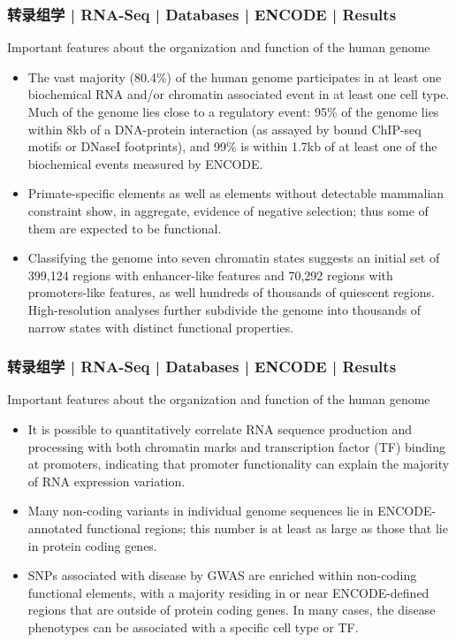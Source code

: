 \begin{frame}
  \frametitle{转录组学 | RNA-Seq | Databases | ENCODE | Results}
  {\footnotesize
  \begin{block}{Important features about the organization and function of the human genome}
  \begin{itemize}
    \item The vast majority (80.4\%) of the human genome participates in at least one biochemical RNA and/or chromatin associated event in at least one cell type. Much of the genome lies close to a regulatory event: 95\% of the genome lies within 8kb of a DNA-protein interaction (as assayed by bound ChIP-seq motifs or DNaseI footprints), and 99\% is within 1.7kb of at least one of the biochemical events measured by ENCODE.
    \item Primate-specific elements as well as elements without detectable mammalian constraint show, in aggregate, evidence of negative selection; thus some of them are expected to be functional.
    \item Classifying the genome into seven chromatin states suggests an initial set of 399,124 regions with enhancer-like features and 70,292 regions with promoters-like features, as well hundreds of thousands of quiescent regions. High-resolution analyses further subdivide the genome into thousands of narrow states with distinct functional properties.
  \end{itemize}
  \end{block}
  }
\end{frame}

\begin{frame}
  \frametitle{转录组学 | RNA-Seq | Databases | ENCODE | Results}
  \begin{block}{Important features about the organization and function of the human genome}
  \begin{itemize}
    \item It is possible to quantitatively correlate RNA sequence production and processing with both chromatin marks and transcription factor (TF) binding at promoters, indicating that promoter functionality can explain the majority of RNA expression variation.
    \item Many non-coding variants in individual genome sequences lie in ENCODE-annotated functional regions; this number is at least as large as those that lie in protein coding genes.
    \item SNPs associated with disease by GWAS are enriched within non-coding functional elements, with a majority residing in or near ENCODE-defined regions that are outside of protein coding genes. In many cases, the disease phenotypes can be associated with a specific cell type or TF.
  \end{itemize}
  \end{block}
\end{frame}

